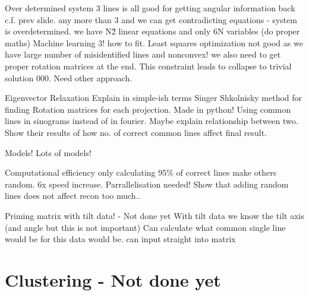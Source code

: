 \documentclass[t, 11pt]{beamer}
\begin{document}
\begin{frame}[fragile]{Over determined system}
  3 lines is all good for getting angular information back c.f. prev slide.
  any more than 3 and we can get contradicting equations - system is overdetermined. we have N\^2 linear equations and only 6N variables (do proper maths)
  Machine learning 3! how to fit. Least squares optimization not good as we have large number of misidentified lines and nonconvex! we also need to get proper rotation matrices at the end. This constraint leads to collapse to trivial solution 000. Need other approach.
\end{frame}

\begin{frame}[fragile]{Eigenvector Relaxation}
  Explain in simple-ish terms Singer Shkolnisky method for finding Rotation matrices for each projection.
  Made in python! Using common lines in sinograms instead of in fourier. Maybe explain relationship between two. 
  Show their results of how no. of correct common lines affect final result.
\end{frame}

\begin{frame}[fragile]{Models!}
  Lots of models!
\end{frame}

\begin{frame}[fragile]{Computational efficiency}
  only calculating 95\% of correct lines make others random. 6x speed increase. Parrallelisation needed!
  Show that adding random lines does not affect recon too much..
\end{frame}

\begin{frame}[fragile]{Priming matrix with tilt data! - Not done yet}
  With tilt data we know the tilt axis (and angle but this is not important)
  Can calculate what common single line would be for this data would be. can input straight into matrix
\end{frame}


\section{Clustering - Not done yet}
\end{document}
